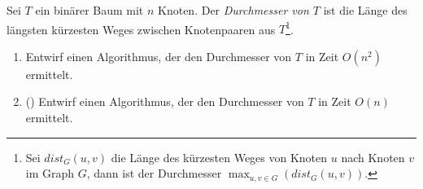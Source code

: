 \documentclass{uebung_cs}
\begin{document}
\begin{aufgabe}
	Sei $T$ ein binärer Baum mit $n$ Knoten.
	Der \textit{Durchmesser von $T$} ist die Länge des längsten kürzesten Weges zwischen Knotenpaaren aus $T$\footnote{Sei $dist_G(u,v)$ die Länge des kürzesten Weges von Knoten $u$ nach Knoten $v$ im Graph $G$, dann ist der Durchmesser $\max_{u,v\in G}( dist_G(u,v) )$.}.
	\begin{enumerate}
		\item \mittel Entwirf einen Algorithmus, der den Durchmesser von $T$ in Zeit $O(n^2)$ ermittelt.
		\item \note (\veryhard) Entwirf einen Algorithmus, der den Durchmesser von $T$ in Zeit $O(n)$ ermittelt.
	\end{enumerate}
\end{aufgabe}
\end{document}
